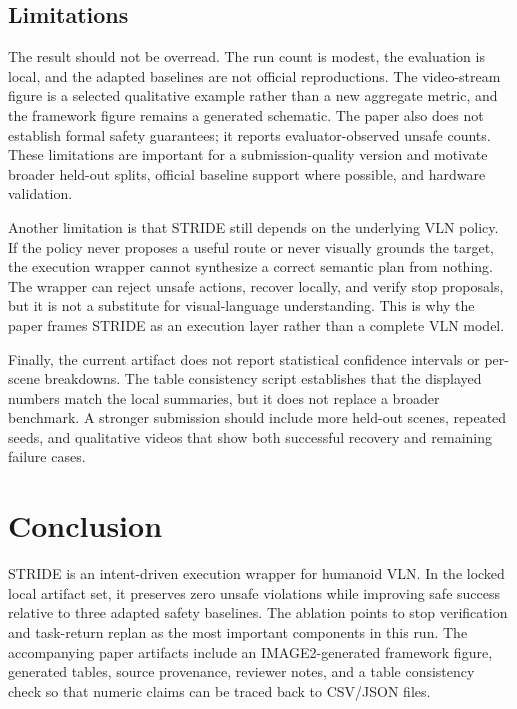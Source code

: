 \documentclass[letterpaper,10pt,conference]{ieeeconf}
\begin{document}
\subsection{Limitations}
The result should not be overread. The run count is modest, the evaluation is local, and the adapted baselines are not official reproductions. The video-stream figure is a selected qualitative example rather than a new aggregate metric, and the framework figure remains a generated schematic. The paper also does not establish formal safety guarantees; it reports evaluator-observed unsafe counts. These limitations are important for a submission-quality version and motivate broader held-out splits, official baseline support where possible, and hardware validation.

Another limitation is that STRIDE still depends on the underlying VLN policy. If the policy never proposes a useful route or never visually grounds the target, the execution wrapper cannot synthesize a correct semantic plan from nothing. The wrapper can reject unsafe actions, recover locally, and verify stop proposals, but it is not a substitute for visual-language understanding. This is why the paper frames STRIDE as an execution layer rather than a complete VLN model.

Finally, the current artifact does not report statistical confidence intervals or per-scene breakdowns. The table consistency script establishes that the displayed numbers match the local summaries, but it does not replace a broader benchmark. A stronger submission should include more held-out scenes, repeated seeds, and qualitative videos that show both successful recovery and remaining failure cases.

\section{Conclusion}
STRIDE is an intent-driven execution wrapper for humanoid VLN. In the locked local artifact set, it preserves zero unsafe violations while improving safe success relative to three adapted safety baselines. The ablation points to stop verification and task-return replan as the most important components in this run. The accompanying paper artifacts include an IMAGE2-generated framework figure, generated tables, source provenance, reviewer notes, and a table consistency check so that numeric claims can be traced back to CSV/JSON files.



\end{document}
